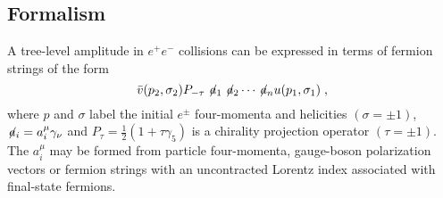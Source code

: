 
\subsection{Formalism} \label{hairymath}

A tree-level amplitude in $e^+e^-$ collisions can be expressed in
terms of fermion strings of the form
\begin{equation}
\bar v(p_2,\sigma_2)P_{-\tau}\not\!a_1\not\!a_2\cdots
\not\!a_nu(p_1,\sigma_1)\;,
\end{equation}
where $p$ and $\sigma$ label the initial $e^{\pm}$ four-momenta
and helicities $(\sigma = \pm 1)$, $\not\!a_i=a^\mu_i\gamma_\nu$
and $P_\tau=\frac{1}{2}(1+\tau\gamma_5)$ is a chirality projection
operator $(\tau = \pm1)$.  The $a^\mu_i$ may be formed from particle
four-momenta, gauge-boson polarization vectors or fermion strings with
an uncontracted Lorentz index associated with final-state fermions.


